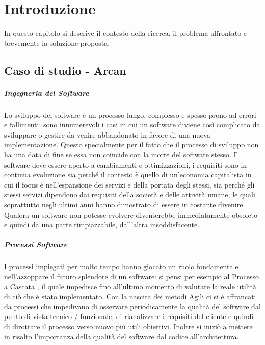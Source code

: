 \chapter{Introduzione}

In questo capitolo si descrive il contesto della ricerca, il problema affrontato e brevemente la soluzione proposta.

\section{Caso di studio - Arcan}

\paragraph{Ingegneria del Software}

Lo sviluppo del software \`e un processo lungo, complesso e spesso prono ad errori e fallimenti: sono innumerevoli i casi in cui un software diviene cos\`i complicato da sviluppare o gestire da venire abbandonato in favore di una nuova implementazione. Questo specialmente per il fatto che il processo di sviluppo non ha una data di fine se essa non coincide con la morte del software stesso. Il software deve essere aperto a cambiamenti e ottimizzazioni, i requisiti sono in continua evoluzione sia perch\'e il contesto \`e quello di un'economia capitalista in cui il focus \`e nell'espansione dei servizi e della portata degli stessi, sia perch\'e gli stessi servizi dipendono dai requisiti della societ\`a e delle attivit\`a umane, le quali soprattutto negli ultimi anni hanno dimostrato di essere in costante divenire. Qualora un software non potesse evolvere diventerebbe immediatamente obsoleto e quindi da una parte rimpiazzabile, dall'altra insoddisfacente.

\paragraph{Processi Software}

I processi impiegati per molto tempo hanno giocato un ruolo fondamentale nell'azzoppare il futuro splendore di un software: si pensi per esempio al Processo a Cascata \cite{larman2002applying}, il quale impedisce fino all'ultimo momento di valutare la reale utilit\`a di ci\`o che \`e stato implementato. Con la nascita dei metodi Agili \cite{larman2002applying} ci si \`e affrancati da processi che impedivano di osservare periodicamente la qualit\`a del software dal punto di vista tecnico / funzionale, di rianalizzare i requisiti del cliente e quindi di dirottare il processo verso nuovo pi\`u utili obiettivi. Inoltre si inizi\`o a mettere in risalto l'importanza della qualit\`a del software dal codice all'architettura.

